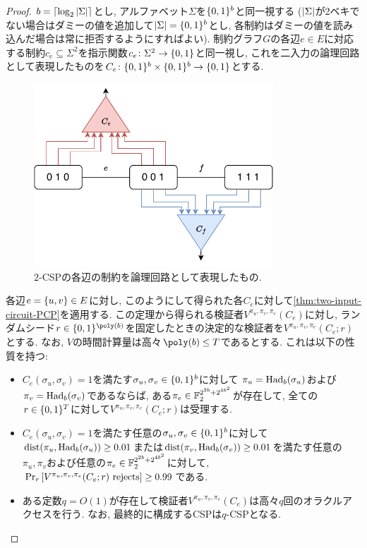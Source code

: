 \begin{proof}
  $b = \lceil\log_2\abs{\Sigma}\rceil$とし, アルファベット$\Sigma$を$\{0,1\}^b$と同一視する
  ($\abs{\Sigma}$が2ベキでない場合はダミーの値を追加して$\abs{\Sigma}=\{0,1\}^b$とし, 各制約はダミーの値を読み込んだ場合は常に拒否するようにすればよい).
  制約グラフ$G$の各辺$e\in E$に対応する制約$c_e\subseteq \Sigma^2$を指示関数$c_e\colon\Sigma^2\to\{0,1\}$と同一視し, これを二入力の論理回路として表現したものを$C_e\colon \{0,1\}^b\times \{0,1\}^b\to \{0,1\}$とする.

  \begin{figure}[ht]
    \centering
    \includegraphics[width=0.8\textwidth]{images/newCSP.pdf}
    \caption{$2$-CSPの各辺の制約を論理回路として表現したもの. \label{fig:newCSP}}
  \end{figure}

  各辺$e=\qty{u,v}\in E$に対し, このようにして得られた各$C_e$に対して\cref{thm:two-input-circuit-PCP}を適用する.
  この定理から得られる検証者$V^{\pi_u,\pi_v,\pi_e}(C_e)$に対し,
  ランダムシード$r\in\binset^{\poly(b)}$を固定したときの決定的な検証者を$V^{\pi_u,\pi_v,\pi_e}(C_e;r)$とする. なお, $V$の時間計算量は高々$\poly(b)\le T$であるとする.
  これは以下の性質を持つ:
  \begin{itemize}
    \item $C_e(\sigma_u,\sigma_v)=1$を満たす$\sigma_u,\sigma_v\in\{0,1\}^b$に対して $\pi_u=\mathrm{Had}_b(\sigma_u)$および$\pi_v=\mathrm{Had}_b(\sigma_v)$であるならば, ある$\pi_e\in \mathbb{F}_2^{2^{2b} + 2^{4b^2}}$が存在して, 全ての$r\in\{0,1\}^T$に対して$V^{\pi_u,\pi_v,\pi_e}(C_e;r)$は受理する.
    \item $C_e(\sigma_u,\sigma_v)=1$を満たす任意の$\sigma_u,\sigma_v\in\{0,1\}^b$に対して$\mathrm{dist}(\pi_u,\mathrm{Had}_b(\sigma_u))\ge0.01$または$\mathrm{dist}(\pi_v,\mathrm{Had}_b(\sigma_v))\ge0.01$を満たす任意の$\pi_u,\pi_v$および任意の$\pi_e \in \mathbb{F}_2^{2^{2b} + 2^{4b^2}}$に対して, $\Pr_r\qty[V^{\pi_u,\pi_v,\pi_e}(C_e;r)\text{ rejects}]\ge 0.99$である.
    \item ある定数$q=O(1)$が存在して検証者$V^{\pi_u,\pi_v,\pi_e}(C_e)$は高々$q$回のオラクルアクセスを行う. なお, 最終的に構成するCSPは$q$-CSPとなる.
  \end{itemize}
  

\end{proof}
